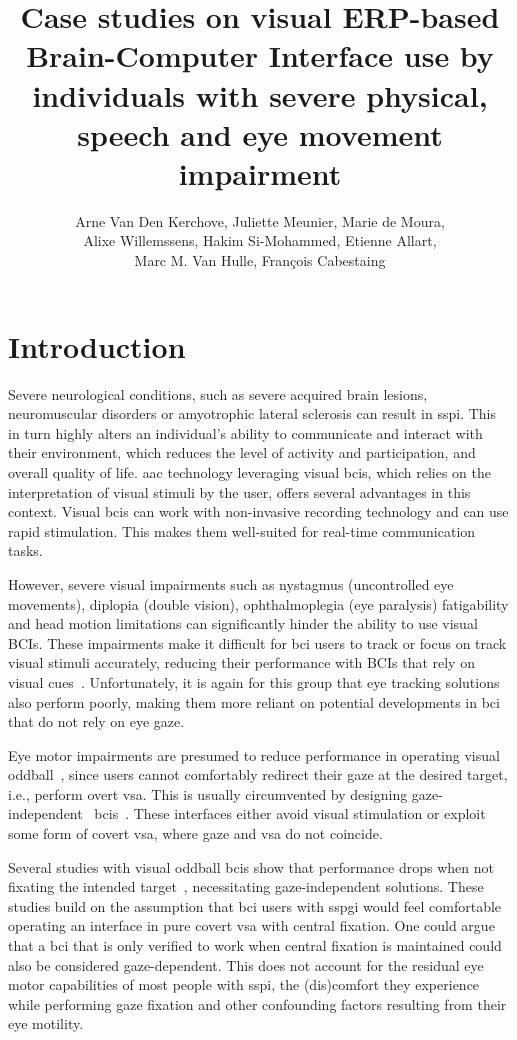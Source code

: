 \documentclass[twocolumn]{article}
\author{
Arne Van Den Kerchove,
Juliette Meunier,
Marie de Moura, \\
Alixe Willemssens,
Hakim Si-Mohammed,
Etienne Allart, \\
Marc M. Van Hulle,
François Cabestaing
}
\title{Case studies on visual ERP-based Brain-Computer Interface use by
individuals with severe physical, speech and eye movement impairment}
\begin{document}
\maketitle

\begin{abstract}
\end{abstract}

\section{Introduction}

Severe neurological conditions, such as severe acquired brain lesions,
neuromuscular disorders or amyotrophic lateral sclerosis can result in
\ac{sspi}.
This in turn highly alters an individual's ability to communicate and interact
with their environment, which reduces the level of activity and participation,
and overall quality of life.
\Ac{aac} technology leveraging visual \acp{bci},
which relies on the interpretation of visual stimuli by the user,
offers several advantages in this context.
Visual \acp{bci} can work with non-invasive recording technology and can use rapid
stimulation.
This makes them well-suited for real-time communication tasks.

However, severe visual impairments such as nystagmus (uncontrolled eye movements), diplopia (double
vision), ophthalmoplegia (eye paralysis) fatigability and head motion
limitations can significantly hinder the ability to use visual BCIs.
These impairments make it difficult for
\ac{bci} users to track or focus on track visual stimuli accurately, reducing their
performance with BCIs that rely on visual cues~\cite{McCane2014,FriedOken2020,Pasqualotto2015}.
Unfortunately, it is again for this group that eye tracking solutions also
perform poorly, making them more reliant on potential developments in \ac{bci}
that do not rely on eye gaze.

Eye motor impairments are presumed to reduce performance in operating visual
oddball~\cite{VanDenKerchove2024a}, since users
cannot comfortably redirect their gaze at the desired target,
i.e., perform overt \ac{vsa}.
This is usually circumvented by designing gaze-independent~
\acp{bci}~\cite{Riccio2012}.
These interfaces either avoid visual stimulation or exploit some form of
covert \ac{vsa}, where gaze and \ac{vsa} do not coincide.

Several studies with visual oddball \acp{bci} show that performance drops when not fixating the intended
target~\cite{Brunner2010, Treder2010, RonAngevin2019}, necessitating
gaze-in\-de\-pen\-dent solutions.
These studies build on the assumption that \ac{bci} users with \ac{sspgi}
would feel comfortable operating an interface in pure covert \ac{vsa} with
central fixation.
One could argue that a \ac{bci} that is only verified to work when central
fixation is maintained could also be considered gaze-dependent.
This does not account for the residual eye motor capabilities of most people
with \ac{sspi}, the (dis)comfort they experience while
performing gaze fixation and other confounding factors resulting from their eye
motility.
\end{document}
